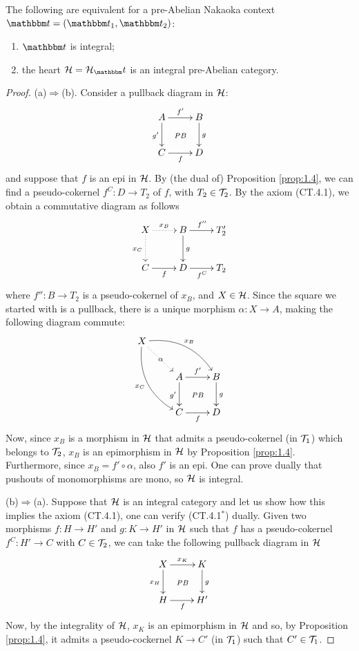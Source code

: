 \begin{thm}
The following are equivalent for a pre-Abelian Nakaoka context $\t=(\t_1,\t_2)$:
\begin{enumerate}[label=(\alph*)]
\item $\t$ is integral;
\item the heart $\clH=\clH_\t$ is an integral pre-Abelian category.
\end{enumerate}
\end{thm}
\begin{proof}
(a)$\Rightarrow$(b). Consider a pullback diagram in $\mathcal{H}$:
\[
\xymatrix{
A\ar@{}[dr]|{PB}\ar[r]^{f'}\ar[d]_{g'}&B\ar[d]^g\\
C\ar[r]_{f}&D
}
\]
and suppose that $f$ is an epi in $\mathcal{H}$. By (the dual of) Proposition \ref{prop:1.4}, we can find a pseudo-cokernel $f^C\colon D\to T_2$ of $f$, with $T_2\in \mathcal{T}_2$. By the axiom (CT.4.1), we obtain a commutative diagram as follows
\[
\xymatrix{
X\ar@{.>}[d]_{x_C}\ar@{.>}[r]^{x_B}&B\ar[r]^{f''}\ar[d]^{g}&T'_2\\
C\ar[r]_f&D\ar[r]_{f^C}&T_2
}
\]
where $f''\colon B\to T_2$ is a pseudo-cokernel of $x_B$, and $X\in \mathcal{H}$. Since the square we started with is a pullback, there is a unique morphism $\alpha\colon X\to A$, making the following diagram commute:
\[
\xymatrix{
X\ar@/_15pt/[ddr]_{x_C}\ar@/_-15pt/[rrd]^{x_B}\ar@{.>}[dr]|\alpha\\
&A\ar@{}[dr]|{PB}\ar[r]^{f'}\ar[d]_{g'}&B\ar[d]^g\\
&C\ar[r]_{f}&D
}
\]
Now, since $x_B$ is a morphism in $\mathcal{H}$ that admits a pseudo-cokernel (in $\mathcal{T}_1$) which belongs to $\mathcal{T}_2$, $x_B$ is an epimorphism in $\mathcal{H}$ by Proposition \ref{prop:1.4}. Furthermore, since $x_B=f'\circ\alpha$, also $f'$ is an epi. One can prove dually that pushouts of monomorphisms are mono, so $\mathcal{H}$ is integral.

\smallskip\noindent
(b)$\Rightarrow$(a). Suppose that $\mathcal{H}$ is an integral category and let us show how this implies the axiom (CT.4.1), one can verify (CT.4.1$^*$) dually. Given two morphisms $f\colon H\to H'$ and $g\colon K\to H'$ in $\mathcal{H}$ such that $f$ has a pseudo-cokernel $f^C\colon H'\to C$ with $C\in \mathcal{T}_2$, we can take the following pullback diagram in $\mathcal{H}$
\[
\xymatrix{
X\ar[d]_{x_H}\ar[r]^{x_K}\ar@{}[dr]|{PB}&K\ar[d]^{g}\\
H\ar[r]_f&H'
}
\]
Now, by the integrality of $\mathcal{H}$, $x_K$ is an epimorphism in $\mathcal{H}$ and so, by Proposition \ref{prop:1.4}, it admits a pseudo-cockernel $K\to C'$ (in $\mathcal{T}_1$) such that $C'\in \mathcal{T}_1$.
\end{proof}




